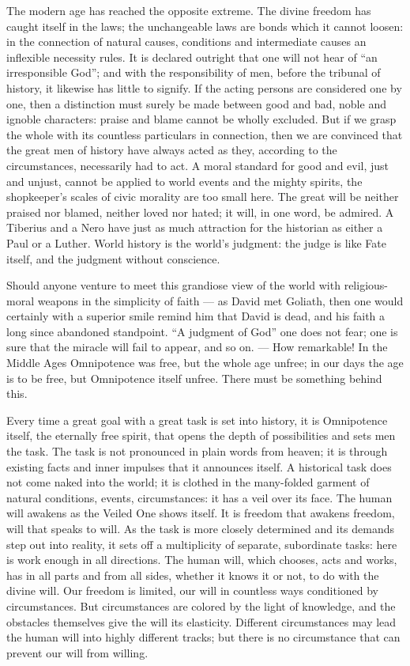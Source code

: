 \documentclass[12pt,a4paper,openany]{book}
\newcommand{\opage}[1]{\marginnote{\footnotesize\textit{[#1]}}}
\begin{document}
The modern age has reached the opposite extreme.
The divine freedom has caught itself
in the laws; the unchangeable laws are bonds which it
cannot loosen: in the connection of natural causes,
conditions and intermediate causes an inflexible
necessity rules. It is declared outright that one will not
hear of ``an irresponsible God''; and with the responsibility of men,
before the tribunal of history,
it likewise has little to signify. If the acting
persons are considered one by one, then a distinction must surely be made
between good and bad, noble and ignoble characters:
\setcounter{footnote}{0}%
\opage{89}praise and blame cannot be wholly excluded. But if we grasp
the whole with its countless particulars in connection,
then we are convinced that the great men of history have always acted as they,
according to the circumstances,
necessarily had to act. A moral
standard for good and evil, just and unjust,
cannot be applied to world events and the
mighty spirits, the shopkeeper's scales of civic morality are
too small here. The great will be neither praised nor blamed,
neither loved nor hated; it will, in one word, be admired.
A Tiberius and a Nero have just as much
attraction for the historian as either a Paul
or a Luther. World history is the world's judgment:
the judge is like Fate itself, and the judgment without
conscience.

Should anyone venture to meet this grandiose
view of the world with religious-moral weapons in the simplicity
of faith --- as David met Goliath, then
one would certainly with a superior smile remind him
that David is dead, and his faith a long since abandoned
standpoint. ``A judgment of God'' one does not fear;
one is sure that the miracle will fail to appear, and so on. ---
How remarkable! In the Middle Ages Omnipotence was free,
but the whole age unfree; in our days the age is to
be free, but Omnipotence itself unfree. There must be
something behind this.

Every time a great goal with a great task
is set into history, it is Omnipotence itself, the eternally
free spirit, that opens the depth of possibilities and sets
men the task. The task is not pronounced in plain
words from heaven; it is through existing facts
and inner impulses that it announces itself.
\setcounter{footnote}{0}%
\opage{90}A historical task does not come naked into the world;
it is clothed in the many-folded garment of natural conditions, events, circumstances:
it has a veil over its
face. The human will awakens as the Veiled One
shows itself. It is freedom that awakens freedom, will
that speaks to will. As the task is more closely
determined and its demands step out into reality,
it sets off a multiplicity of separate,
subordinate tasks: here is work enough in all
directions. The human will, which chooses, acts
and works, has in all parts and from all sides, whether
it knows it or not, to do with the divine will.
Our freedom is limited, our will in
countless ways conditioned by circumstances. But
circumstances are colored by the light of knowledge, and
the obstacles themselves give the will its elasticity. Different
circumstances may lead the human will
into highly different tracks; but there is no circumstance
that can prevent our will from willing.
\end{document}
